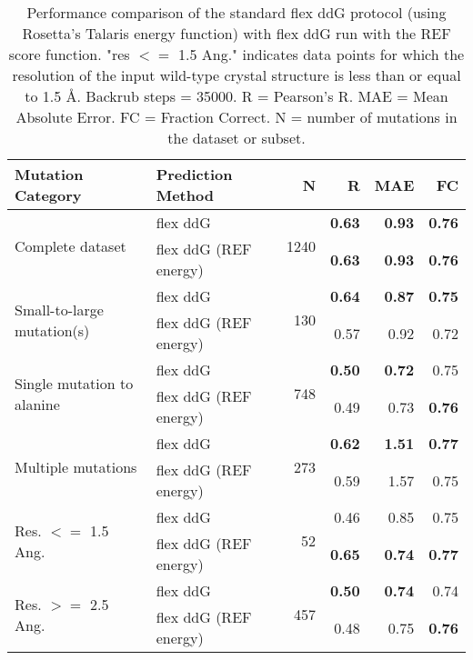 \begin{table}
  \begin{tabular}{llrrrr}
\toprule
Mutation Category &      Prediction Method &     N &    R &  MAE &   FC \\
\midrule
 \multirow{ 2}{*}{Complete dataset} & flex ddG & \multirow{ 2}{*}{1240} & \textbf{0.63} & \textbf{0.93} & \textbf{0.76}  \\
 & flex ddG (REF energy) & & \textbf{0.63} & \textbf{0.93} & \textbf{0.76}  \\
\hline
 \multirow{ 2}{*}{Small-to-large mutation(s)} & flex ddG & \multirow{ 2}{*}{130} & \textbf{0.64} & \textbf{0.87} & \textbf{0.75}  \\
 & flex ddG (REF energy) & & 0.57 & 0.92 & 0.72  \\
\hline
 \multirow{ 2}{*}{Single mutation to alanine} & flex ddG & \multirow{ 2}{*}{748} & \textbf{0.50} & \textbf{0.72} & 0.75  \\
 & flex ddG (REF energy) & & 0.49 & 0.73 & \textbf{0.76}  \\
\hline
 \multirow{ 2}{*}{Multiple mutations} & flex ddG & \multirow{ 2}{*}{273} & \textbf{0.62} & \textbf{1.51} & \textbf{0.77}  \\
 & flex ddG (REF energy) & & 0.59 & 1.57 & 0.75  \\
\hline
 \multirow{ 2}{*}{Res. $<=$ 1.5 Ang.} & flex ddG & \multirow{ 2}{*}{52} & 0.46 & 0.85 & 0.75  \\
 & flex ddG (REF energy) & & \textbf{0.65} & \textbf{0.74} & \textbf{0.77}  \\
\hline
 \multirow{ 2}{*}{Res. $>=$ 2.5 Ang.} & flex ddG & \multirow{ 2}{*}{457} & \textbf{0.50} & \textbf{0.74} & 0.74  \\
 & flex ddG (REF energy) & & 0.48 & 0.75 & \textbf{0.76}  \\
\bottomrule
\end{tabular}
  \caption[REF results]{
    Performance comparison of the standard flex ddG protocol (using Rosetta's Talaris energy function) with flex ddG run with the REF score function. "res $<=$ 1.5 Ang." indicates data points for which the resolution of the input wild-type crystal structure is less than or equal to 1.5 \AA. Backrub steps = 35000. R = Pearson's R. MAE = Mean Absolute Error. FC = Fraction Correct. N = number of mutations in the dataset or subset.
  } \label{tab:table-ref}
\end{table}
